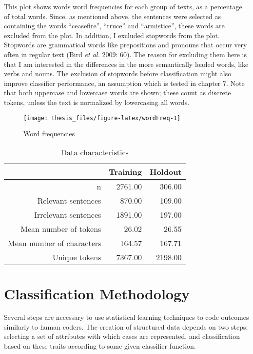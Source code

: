 \documentclass[12pt,twoside]{reedthesis}
\begin{document}
This plot shows words word frequencies for each group of texts, as a
percentage of total words. Since, as mentioned above, the sentences were
selected as containing the words ``ceasefire'', ``truce'' and
``armistice'', these words are excluded from the plot. In addition, I
excluded stopwords from the plot. Stopwords are grammatical words like
prepositions and pronouns that occur very often in regular text (Bird
\emph{et al.} 2009: 60). The reason for excluding them here is that I am
interested in the differences in the more semantically loaded words,
like verbs and nouns. The exclusion of stopwords before classification
might also improve classifier performance, an assumption which is tested
in chapter 7. Note that both uppercase and lowercase words are shown;
these count as discrete tokens, unless the text is normalized by
lowercasing all words.
\begin{figure}

\texttt{[image: thesis\_files/figure-latex/wordFreq-1]} \hfill{}

\caption{Word frequencies}\label{fig:wordFreq}
\end{figure}
\begin{table}[ht]
\centering
\begin{tabular}{rrr}
  \hline
 & Training & Holdout \\ 
  \hline
n & 2761.00 & 306.00 \\ 
  Relevant sentences & 870.00 & 109.00 \\ 
  Irrelevant sentences & 1891.00 & 197.00 \\ 
  Mean number of tokens & 26.02 & 26.55 \\ 
  Mean number of characters & 164.57 & 167.71 \\ 
  Unique tokens & 7367.00 & 2198.00 \\ 
   \hline
\end{tabular}
\caption{Data characteristics} 
\end{table}
\newpage

\chapter{Classification Methodology}\label{classification-methodology}

Several steps are necessary to use statistical learning techniques to
code outcomes similarly to human coders. The creation of structured data
depends on two steps; selecting a set of attributes with which cases are
represented, and classification based on these traits according to some
given classifier function.
\end{document}
